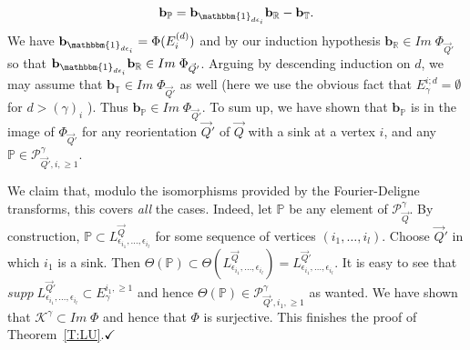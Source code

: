 \documentclass[a4paper,10pt]{amsart}
\def\qed{$\hfill \checkmark$}
\numberwithin{equation}{section}
\begin{document}
$$\mathbf{b}_{\mathbb{P}}=\mathbf{b}_{\mathbbm{1}_{d\epsilon_i}} \mathbf{b}_{\mathbb{R}} - \mathbf{b}_{\mathbb{T}}.$$
We have $\mathbf{b}_{\mathbbm{1}_{d\epsilon_i}}=\Phi(E_i^{(d)})$ and by our induction hypothesis $\mathbf{b}_{\mathbb{R}} \in Im\;\Phi_{\vec{Q}'}$ so that $\mathbf{b}_{\mathbbm{1}_{d\epsilon_i}} \mathbf{b}_{\mathbb{R}} \in Im\;\Phi_{\vec{Q}'}$. Arguing by descending induction on $d$, we may assume that $\mathbf{b}_{\mathbb{T}} \in Im\;\Phi_{\vec{Q}'}$ as well (here we use the obvious fact that $E_{\gamma}^{i; d}=\emptyset$ for $d > (\gamma)_i$ ). Thus $\mathbf{b}_{\mathbb{P}} \in Im\;\Phi_{\vec{Q}'}$. To sum up, we have shown that $\mathbf{b}_{\mathbb{P}}$ is in the image of $\Phi_{\vec{Q}'}$ for any reorientation $\vec{Q}'$ of $\vec{Q}$ with a sink at a vertex $i$, and any $\mathbb{P} \in \mathcal{P}_{\vec{Q}',i, \geq 1}^{\gamma}$.

We claim that, modulo the isomorphisms provided by the Fourier-Deligne transforms, this covers \textit{all} the cases. Indeed, let $\mathbb{P}$ be any element of $\mathcal{P}^{\gamma}_{\vec{Q}}$. By construction, $\mathbb{P} \subset L^{\vec{Q}}_{\epsilon_{i_1}, \ldots, \epsilon_{i_l}}$ for some sequence of vertices $(i_1, \ldots, i_l)$. Choose $\vec{Q}'$ in which $i_1$ is a sink. Then $\Theta(\mathbb{P}) \subset \Theta( L^{\vec{Q}}_{\epsilon_{i_1}, \ldots, \epsilon_{i_l}})= L^{\vec{Q}'}_{\epsilon_{i_1}, \ldots, \epsilon_{i_l}}$. It is easy to see that $supp\;  L^{\vec{Q}'}_{\epsilon_{i_1}, \ldots, \epsilon_{i_l}} \subset E_{\gamma}^{i_1, \geq 1}$ and hence $\Theta(\mathbb{P}) \in \mathcal{P}_{\vec{Q}',i_1, \geq 1}^{\gamma}$ as wanted. We have shown that $\mathcal{K}^{\gamma} \subset Im\;\Phi$ and hence that $\Phi$ is surjective. This finishes the proof of Theorem~\ref{T:LU}.\qed

\vspace{.15in}
\end{document}
